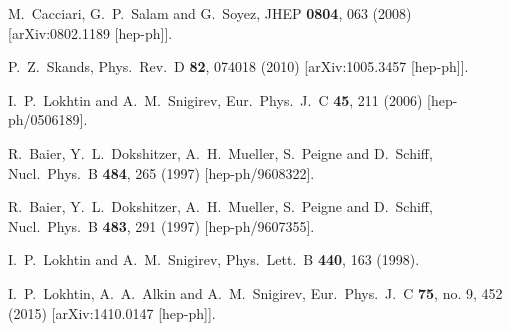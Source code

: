 \documentclass[3p,times,twocolumn]{elsarticle}
\begin{document}
\begin{thebibliography}{}
  M.~Cacciari, G.~P.~Salam and G.~Soyez,
  JHEP {\bf 0804}, 063 (2008)
  [arXiv:0802.1189 [hep-ph]].





  P.~Z.~Skands,
  Phys.\ Rev.\ D {\bf 82}, 074018 (2010)
  [arXiv:1005.3457 [hep-ph]].


  I.~P.~Lokhtin and A.~M.~Snigirev,
  Eur.\ Phys.\ J.\ C {\bf 45}, 211 (2006)
  [hep-ph/0506189].


  R.~Baier, Y.~L.~Dokshitzer, A.~H.~Mueller, S.~Peigne and D.~Schiff,
  Nucl.\ Phys.\ B {\bf 484}, 265 (1997)
  [hep-ph/9608322].


  R.~Baier, Y.~L.~Dokshitzer, A.~H.~Mueller, S.~Peigne and D.~Schiff,
  Nucl.\ Phys.\ B {\bf 483}, 291 (1997)
  [hep-ph/9607355].

  I.~P.~Lokhtin and A.~M.~Snigirev,
  Phys.\ Lett.\ B {\bf 440}, 163 (1998).



  I.~P.~Lokhtin, A.~A.~Alkin and A.~M.~Snigirev,
  Eur.\ Phys.\ J.\ C {\bf 75}, no. 9, 452 (2015)
  [arXiv:1410.0147 [hep-ph]].



\end{thebibliography}
\end{document}
